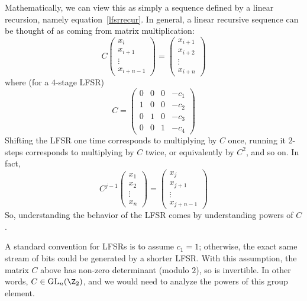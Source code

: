 \documentclass[12pt]{amsart}
\DeclareMathOperator{\GL}{GL}
\theoremstyle{plain}
\theoremstyle{definition}
\theoremstyle{remark}
\begin{document}
Mathematically, we can view this as simply a sequence defined by a
linear recursion, namely equation~\eqref{lfsrrecur}.  In general, a
linear recursive sequence can be thought of as coming from matrix
multiplication:
\[ C 
\begin{pmatrix} x_i \\ x_{i+1} \\ \vdots \\ x_{i+n-1} \end{pmatrix} =
\begin{pmatrix} x_{i+1} \\ x_{i+2} \\ \vdots \\ x_{i+n} \end{pmatrix}
\]
where (for a $4$-stage LFSR)
\[ C = \begin{pmatrix} 0 & 0 & 0 & -c_1 \\
1 & 0  & 0 & -c_2 \\
0 & 1  & 0 & -c_3 \\
0 & 0 & 1 & -c_4 
\end{pmatrix}
\]
Shifting the LFSR one time corresponds to multiplying by $C$ once,
running it $2$-steps corresponds to multiplying by $C$ twice, or
equivalently by $C^2$, and so on.  In fact,
\[ C^{j-1}
\begin{pmatrix} x_1 \\ x_{2} \\ \vdots \\ x_{n} \end{pmatrix} =
\begin{pmatrix} x_{j} \\ x_{j+1} \\ \vdots \\ x_{j+n-1} \end{pmatrix}
\]
So, understanding the behavior of the LFSR comes by understanding
powers of $C$.

A standard convention for LFSRs is to assume $c_1=1$; otherwise, the
exact same stream of bits could be generated by a shorter LFSR.  With
this assumption, the matrix $C$ above has non-zero determinant (modulo
$2$), so is invertible.  In other words, $C\in \GL_n(\Z_2)$, and we
would need to analyze the powers of this group element.
\end{document}
